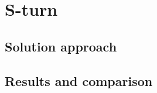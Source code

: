 \section{S-turn}
%
\subsection{Solution approach}
%
\subsection{Results and comparison}
%

%
\begin{figure}[ht!]
    \centering
    \caption{}
    \label{fig:S-Shapel}
\end{figure}
%